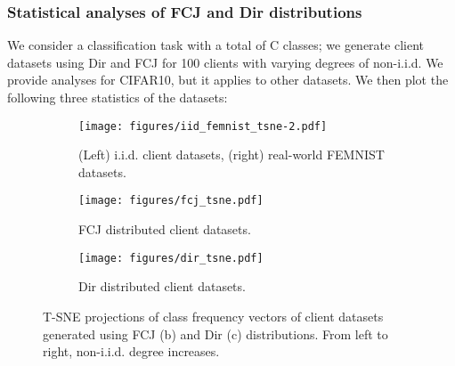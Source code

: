 \subsubsection{Statistical analyses of FCJ and Dir distributions}\label{impact:distribution:statistical_analyses}
We consider a classification task with a total of C classes; we generate client datasets using Dir and FCJ for 100 clients with varying degrees of non-i.i.d. We provide analyses for CIFAR10, but it applies to other datasets. We then plot the following three statistics of the datasets:
\begin{figure}[t]
    \centering
    \begin{subfigure}[b]{\columnwidth}
        \hspace{-.6cm}
        \texttt{[image: figures/iid\_femnist\_tsne-2.pdf]}
        \caption{(Left) i.i.d. client datasets, (right) real-world FEMNIST datasets.}
        \label{fig:iid_femnist_tsne}
    \end{subfigure}
    \begin{subfigure}[b]{1\columnwidth}
        \texttt{[image: figures/fcj\_tsne.pdf]}
        \caption{FCJ distributed client datasets.}
        \label{fig:fcj_tsne}
    \end{subfigure}
    \begin{subfigure}[b]{1\columnwidth}
        \texttt{[image: figures/dir\_tsne.pdf]}
        \caption{Dir distributed client datasets.}
        \label{fig:dir_tsne}
    \end{subfigure}
    \caption{T-SNE projections of class frequency vectors of client datasets generated using FCJ (b) and Dir (c) distributions. From left to right, non-i.i.d. degree increases.}
    \label{fig:tsne_dir_fcj}
\end{figure}

